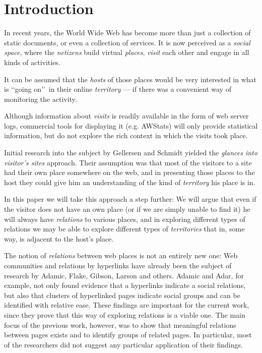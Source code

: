 \documentclass[a4paper,twoside]{danarticle}
\theoremstyle{remark}
\begin{document}
  \section{Introduction}
    In recent years, the World Wide Web has become more than just a collection
    of static documents, or even a collection of services. It is now perceived
    as a \textit{social space}, where the \textit{netizens} build virtual
    \textit{places}, \textit{visit} each other and engage in all kinds of
    activities.
    
    It can be assumed that the \textit{hosts} of those places would be
    very interested in what is \lq\lq going on\rq\rq\ in their online
    \textit{territory} --- if
    there was a convenient way of monitoring the activity. 
    
    Although
    information about \textit{visits} is readily available in the
    form of web server logs, commercial tools for displaying it (e.g. 
    AWStats\cite{awstats}) will only
    provide statistical information, but do not explore the rich context in which
    the visits took place. 
    
    Initial research into the subject by Gellersen and Schmidt\cite{webaware}
    yielded the
    \textit{glances into visitor's sites} approach. Their assumption was 
    that most of
    the visitors to a site had their own place somewhere on the web, and in
    presenting those places to the host they could give him an understanding of the
    kind of \textit{territory} his place is in.
    
    In this paper we will take this approach a step further: We will argue that
    even if the visitor does not have an own place (or if we are
    simply unable to find it) he will always have \textit{relations} to various
    places, and in exploring different types of relations we may be able to
    explore different types of \textit{territories} that in, some way, is adjacent to
    the host's place.
    
    The notion of \emph{relations} between web places is not an entirely new 
    one: Web communities and relations by hyperlinks have already 
    been the subject of research by Adamic\cite{links},
    Flake\cite{flake}, Gibson\cite{gibson}, 
    Larson\cite{larson} and others. 
    Adamic and Adar, for example, not only found 
    evidence that a hyperlinks indicate a social relations, but also that 
    clusters of hyperlinked pages indicate social groups and can be identified 
    with relative ease\cite{links}. These findings are important for the current work, 
    since they prove that this way of exploring relations is a viable one. The main
    focus of the previous work, however, was to show that meaningful relations 
    between pages exists and to identify groups of related pages. In particular,
    most of the researchers did not suggest any particular application of their
    findings.
    
\end{document}
